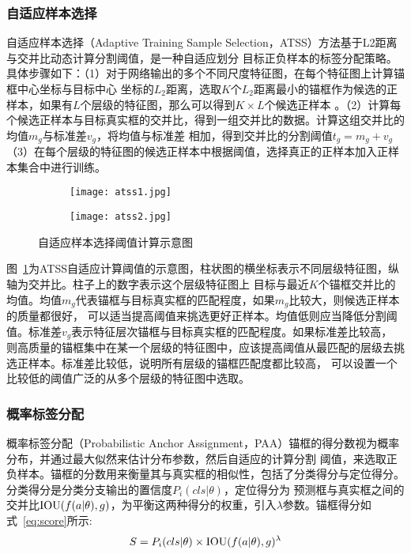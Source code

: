 \subsubsection{自适应样本选择}
自适应样本选择（Adaptive Training Sample Selection，ATSS）方法\cite{zhang2020bridging}基于L2距离与交并比动态计算分割阈值，是一种自适应划分
目标正负样本的标签分配策略。具体步骤如下：（1）对于网络输出的多个不同尺度特征图，在每个特征图上计算锚框中心坐标与目标中心
坐标的$L_2$距离，选取$K$个$L_2$距离最小的锚框作为候选的正样本，如果有$L$个层级的特征图，那么可以得到$K \times L$个候选正样本
。（2）计算每个候选正样本与目标真实框的交并比，得到一组交并比的数据。计算这组交并比的均值$m_g$与标准差$v_g$，将均值与标准差
相加，得到交并比的分割阈值$t_g = m_g + v_g$（3）在每个层级的特征图的候选正样本中根据阈值，选择真正的正样本加入正样本集合中进行训练。

\begin{figure}[htbp]
	\centering
  \begin{subfigure}{0.48\linewidth}
    \centering
    \texttt{[image: atss1.jpg]}
    \caption{}
  \end{subfigure}
  \begin{subfigure}{0.48\linewidth}
    \centering
    \texttt{[image: atss2.jpg]}
    \caption{}
  \end{subfigure}
\caption{自适应样本选择阈值计算示意图}
	\label{fig:atss}
\end{figure}

图~\ref{fig:atss}为ATSS自适应计算阈值的示意图，柱状图的横坐标表示不同层级特征图，纵轴为交并比。柱子上的数字表示这个层级特征图上
目标与最近$K$个锚框交并比的均值。均值$m_g$代表锚框与目标真实框的匹配程度，如果$m_g$比较大，则候选正样本的质量都很好，
可以适当提高阈值来挑选更好正样本。均值低则应当降低分割阈值。标准差$v_g$表示特征层次锚框与目标真实框的匹配程度。如果标准差比较高，
则高质量的锚框集中在某一个层级的特征图中，应该提高阈值从最匹配的层级去挑选正样本。标准差比较低，说明所有层级的锚框匹配度都比较高，
可以设置一个比较低的阈值广泛的从多个层级的特征图中选取。

\subsubsection{概率标签分配}
概率标签分配（Probabilistic Anchor Assignment，PAA）\cite{kim2020probabilistic}锚框的得分数视为概率分布，并通过最大似然来估计分布参数，然后自适应的计算分割
阈值，来选取正负样本。锚框的分数用来衡量其与真实框的相似性，包括了分类得分与定位得分。分类得分是分类分支输出的置信度${P_i}(cls|\theta )$，定位得分为
预测框与真实框之间的交并比${\rm{IOU}}(f(a|\theta ),g)$，为平衡这两种得分的权重，引入$\lambda$参数。锚框得分如式~\ref{eq:score}所示:
\begin{equation}   
  S = {P_i}(cls|\theta ) \times {\rm{IOU}}{(f(a|\theta ),g)^\lambda } 
  \label{eq:score} 
\end{equation}

